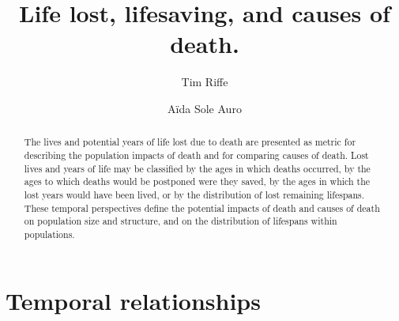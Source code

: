 \documentclass{article}
\begin{document}
\title{Life lost, lifesaving, and causes of death.}

\author[1]{Tim Riffe}
\author[2]{A{\"i}da Sole Auro}

\maketitle

%
\begin{abstract}
The lives and potential years of life lost due to death are presented as metric
for describing the population impacts of death and for comparing causes of
death. Lost lives and years of life may be classified by the ages in which
deaths occurred, by the ages to which deaths would be postponed were they saved, by the
ages in which the lost years would have been lived, or by the distribution of
lost remaining lifespans. These temporal perspectives define the
potential impacts of death and causes of death on population size and structure,
and on the distribution of lifespans within populations. 
\end{abstract}

%


\section*{Temporal relationships}
\end{document}
